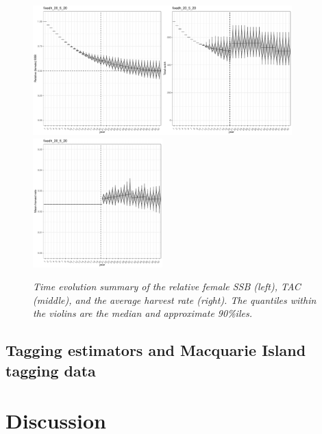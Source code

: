 \documentclass[12pt,a4paper,twoside,times,sky,standard]{csiroreport2017}
\begin{document}
\begin{figure}[hb]
    \begin{center}
        \includegraphics[width=5cm,height=5cm]{figs/fixedh_dep.pdf}\includegraphics[width=5cm,height=5cm]{figs/fixedh_tac.pdf}\includegraphics[width=5cm,height=5cm]{figs/fixedh_hrate.pdf}
    \end{center}
    \caption{\textit{Time evolution summary of the relative female SSB (left), TAC (middle), and the average harvest rate (right). The quantiles within the violins are the median and approximate 90\%iles.}}
\end{figure}


\subsection{Tagging estimators and Macquarie Island tagging data}

\section{Discussion}
\end{document}

